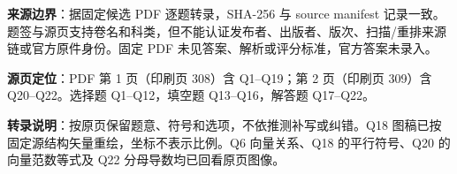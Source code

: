 

\begin{gktip}
\textbf{来源边界}：据固定候选 PDF 逐题转录，SHA-256 与 source manifest 记录一致。题签与源页支持卷名和科类，但不能认证发布者、出版者、版次、扫描/重排来源链或官方原件身份。固定 PDF 未见答案、解析或评分标准，官方答案未录入。

\textbf{源页定位}：PDF 第 1 页（印刷页 308）含 Q1–Q19；第 2 页（印刷页 309）含 Q20–Q22。选择题 Q1–Q12，填空题 Q13–Q16，解答题 Q17–Q22。

\textbf{转录说明}：按原页保留题意、符号和选项，不依推测补写或纠错。Q18 图稿已按固定源结构矢量重绘，坐标不表示比例。Q6 向量关系、Q18 的平行符号、Q20 的向量范数等式及 Q22 分母导数均已回看原页图像。
\end{gktip}


